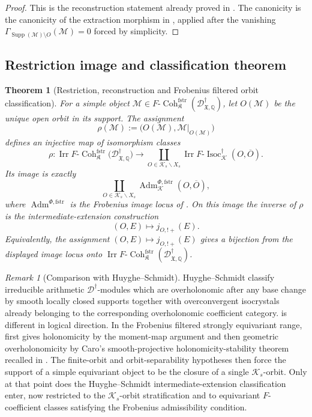 \documentclass[11pt]{amsart}
\theoremstyle{plain}
\newtheorem{theorem}{Theorem}[section]
\theoremstyle{definition}
\theoremstyle{remark}
\newtheorem{remark}{Remark}[section]
\newcommand{\Coh}{\operatorname{Coh}}
\newcommand{\Irr}{\operatorname{Irr}}
\newcommand{\Isoc}{\operatorname{Isoc}}
\newcommand{\Supp}{\operatorname{Supp}}
\newcommand{\fstr}{\mathrm{fstr}}
\newcommand{\Adm}{\operatorname{Adm}}
\begin{document}
\begin{proof}
This is the reconstruction statement already proved in
.  The canonicity is the canonicity of the extraction
morphism in , applied after the vanishing
\(\Gamma_{\Supp(\mathcal M)\setminus O}(\mathcal M)=0\) forced by simplicity.
\end{proof}

\subsection{Restriction image and classification theorem}

\begin{theorem}[Restriction, reconstruction and Frobenius filtered orbit classification]
\label{thm:orbit-classification}
For a simple object
\(\mathcal M\in F\text{-}\Coh^{\fstr}_{\mathfrak K}
(\mathscr D^\dagger_{\mathfrak X,\mathbb Q})\), let \(O(\mathcal M)\) be the
unique open orbit in its support.  The assignment
\[
  \rho(\mathcal M):=\bigl(O(\mathcal M),\mathcal M|_{O(\mathcal M)}\bigr)
\]
defines an injective map of isomorphism classes
\[
  \rho:
  \Irr F\text{-}\Coh^{\fstr}_{\mathfrak K}
  \bigl(\mathscr D^\dagger_{\mathfrak X,\mathbb Q}\bigr)
  \longrightarrow
  \coprod_{O\in \mathcal K_s\backslash X_s}
  \Irr F\text{-}\Isoc^{\dagger}_{\mathcal K}(O,\overline O).
\]
Its image is exactly
\[
  \coprod_{O\in \mathcal K_s\backslash X_s}
  \Adm^{\Phi,\fstr}_{\mathcal K}(O,\overline O),
\]
where \(\Adm^{\Phi,\fstr}\) is the Frobenius image locus of
.  On this image the inverse of
\(\rho\) is the intermediate-extension construction
\[
  (O,E)\longmapsto j_{O,!+}(E).
\]
Equivalently, the assignment \((O,E)\mapsto j_{O,!+}(E)\) gives a bijection
from the displayed image locus onto
\(\Irr F\text{-}\Coh^{\fstr}_{\mathfrak K}
(\mathscr D^\dagger_{\mathfrak X,\mathbb Q})\).
\end{theorem}

\begin{remark}[Comparison with Huyghe--Schmidt]
\label{rem:comparison-HS-theorem-8}
Huyghe--Schmidt \cite[Theorem 2.3.4]{HuygheSchmidtIntermediate} classify
irreducible arithmetic \(\mathscr D^\dagger\)-modules which are overholonomic
after any base change by smooth locally closed supports together with
overconvergent isocrystals already belonging to the corresponding overholonomic
coefficient category.
 is different in logical direction.  In the
Frobenius filtered strongly equivariant range, 
first gives holonomicity by the moment-map argument and then geometric
overholonomicity by Caro's smooth-projective holonomicity-stability theorem recalled in
.  The finite-orbit and orbit-separability hypotheses
then force the support of a simple equivariant object to be the closure of a
single \(\mathcal K_s\)-orbit.  Only at that point does the
Huyghe--Schmidt intermediate-extension classification enter, now restricted to
the \(\mathcal K_s\)-orbit stratification and to equivariant \(F\)-coefficient
classes satisfying the Frobenius admissibility condition.
\end{remark}
\end{document}
